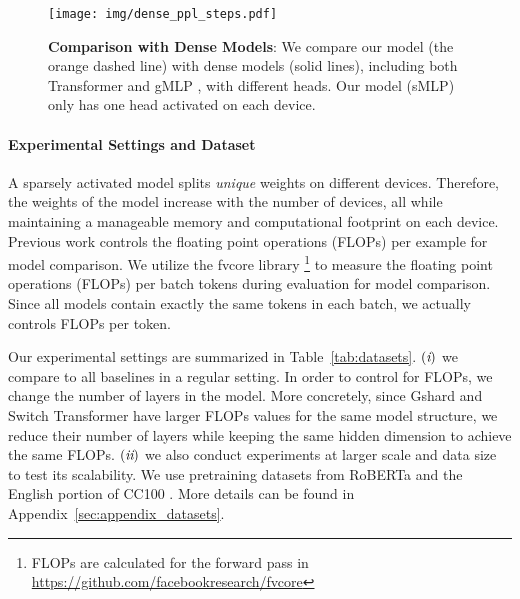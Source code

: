 \documentclass{article}
\newcommand{\RRN}[1]{\textup{\lowercase\expandafter{\it \romannumeral#1}}}
\begin{document}
\begin{figure}
    \centering
    \texttt{[image: img/dense\_ppl\_steps.pdf]}
    \vspace{-2mm}
    \caption{\textbf{Comparison with Dense Models}: We compare our model (the orange dashed line) with dense models (solid lines), including both Transformer \citep{transformer2017} and gMLP \citep{gmlp}, with different heads. Our model (sMLP) only has one head activated on each device.}
    \label{fig:dense_comparison}
\end{figure}

\vspace{-2mm}
\paragraph{Experimental Settings and Dataset}

A sparsely activated model splits \textit{unique} weights on different devices. Therefore, the weights of the model increase with the number of devices, all while maintaining a manageable memory and computational
footprint on each device. Previous work \citep{gshard,switch,alibaba} controls the floating point operations (FLOPs) per example for model comparison. We utilize the fvcore library \footnote{FLOPs are calculated for the forward pass in \url{https://github.com/facebookresearch/fvcore}} to measure the floating point operations (FLOPs) per batch tokens during evaluation for model comparison. Since all models contain exactly the same tokens in each batch, we actually controls FLOPs per token.

Our experimental settings are summarized in Table~\ref{tab:datasets}. $(\RRN{1})$ we compare to all baselines in a regular setting. In order to control for FLOPs, we change the number of layers in the model. More concretely, since Gshard \citep{gshard} and Switch Transformer \citep{switch} have larger FLOPs values for the same model structure, we reduce their number of layers while keeping the same hidden dimension to achieve the same FLOPs. $(\RRN{2})$ we also conduct experiments at larger scale and data size to test its scalability. We use pretraining datasets from RoBERTa \citep{liu2019roberta} and the English portion of CC100 \citep{conneau2019unsupervised}. More details can be found in Appendix~\ref{sec:appendix_datasets}. 
\end{document}
